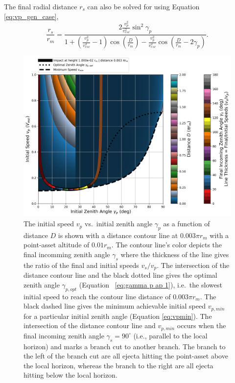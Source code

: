\documentclass{article}
\begin{document}
The final radial distance $r_s$ can also be solved for using Equation \eqref{eq:vp_gen_case},
\begin{equation}\label{eq:rs}
\frac{r_s}{r_m} = \frac{2\frac{v_p^2}{v_{esc}^2}\sin^2\gamma_p}{1 + \left(\frac{v_p^2}{v_{esc}^2}-1\right)\cos\left(\frac{D}{r_m}\right) - \frac{v_p^2}{v_{esc}^2}\cos\left(\frac{D}{r_m} - 2\gamma_p\right)}.
\end{equation}

\clearpage
{}

\begin{figure}[!htb]
	\centering
	\includegraphics[width=1.00\linewidth]{dist_speed_zenith_plot_010_1.000e-02_0.010.png}
	\caption{The initial speed $v_p$ vs.\ initial zenith angle $\gamma_p$ as a function of distance $D$ is shown with a distance contour line at $0.003\pi r_m$ with a point-asset altitude of $0.01 r_m$. The contour line's color depicts the final incomming zenith angle $\gamma_s$ where the thickness of the line gives the ratio of the final and initial speeds $v_s/v_p$. The intersection of the distance contour line and the black dotted line gives the optimal zenith angle $\gamma_{p,opt}$ (Equation~
		\eqref{eq:gamma p ap 1}), i.e.\ the slowest initial speed to reach the contour line distance of $0.003\pi r_m$. The black dashed line gives the minimum achievable initial speed $v_{p,min}$ for a particular initial zenith angle (Equation \eqref{eq:vpmin}). The intersection of the distance contour line and $v_{p,min}$ occurs when the final incoming zenith angle $\gamma_s = 90^\circ$ (i.e., parallel to the local horizon) and marks a branch cut to another branch. The branch to the left of the branch cut are all ejecta hitting the point-asset above the local horizon, whereas the branch to the right are all ejecta hitting below the local horizon.}\label{fig:dist_speed_zenith_plot_010_1.000e-02_0.010}
\end{figure}
\end{document}
